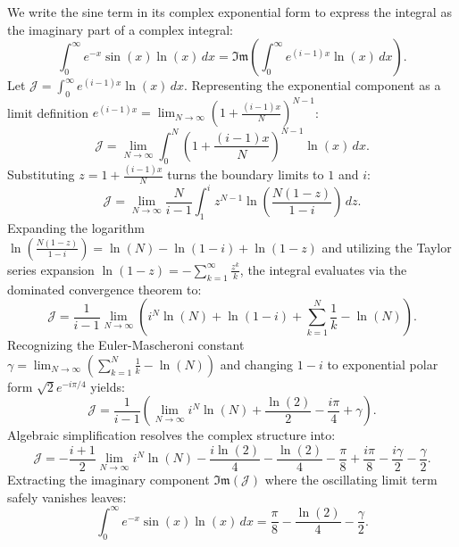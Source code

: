 \begin{questions}
    \begin{solution}
    We write the sine term in its complex exponential form to express the integral as the imaginary part of a complex integral:
    \[ \int_{0}^{\infty} e^{-x}\sin(x)\ln(x) \, dx = \mathfrak{Im}\left(\int_{0}^{\infty} e^{(i-1)x}\ln(x) \, dx\right). \]
    Let $\mathcal{J} = \int_{0}^{\infty} e^{(i-1)x}\ln(x) \, dx$. Representing the exponential component as a limit definition $e^{(i-1)x} = \lim_{N\rightarrow\infty}(1+\frac{(i-1)x}{N})^{N-1}$:
    \[ \mathcal{J} = \lim_{N\rightarrow\infty}\int_{0}^{N} \left(1+\frac{(i-1)x}{N}\right)^{N-1}\ln(x) \, dx. \]
    Substituting $z = 1+\frac{(i-1)x}{N}$ turns the boundary limits to $1$ and $i$:
    \[ \mathcal{J} = \lim_{N\rightarrow\infty} \frac{N}{i-1}\int_{1}^{i} z^{N-1}\ln\left(\frac{N(1-z)}{1-i}\right) \, dz. \]
    Expanding the logarithm $\ln(\frac{N(1-z)}{1-i}) = \ln(N) - \ln(1-i) + \ln(1-z)$ and utilizing the Taylor series expansion $\ln(1-z) = -\sum_{k=1}^{\infty}\frac{z^{k}}{k}$, the integral evaluates via the dominated convergence theorem to:
    \[ \mathcal{J} = \frac{1}{i-1}\lim_{N\rightarrow\infty}\left(i^{N}\ln(N) + \ln(1-i) + \sum_{k=1}^{N}\frac{1}{k} - \ln(N)\right). \]
    Recognizing the Euler-Mascheroni constant $\gamma = \lim_{N\to\infty} (\sum_{k=1}^N \frac{1}{k} - \ln(N))$ and changing $1-i$ to exponential polar form $\sqrt{2}e^{-i\pi/4}$ yields:
    \[ \mathcal{J} = \frac{1}{i-1}\left(\lim_{N\rightarrow\infty}i^{N}\ln(N) + \frac{\ln(2)}{2} - \frac{i\pi}{4} + \gamma\right). \]
    Algebraic simplification resolves the complex structure into:
    \[ \mathcal{J} = -\frac{i+1}{2}\lim_{N\rightarrow\infty}i^{N}\ln(N) - \frac{i\ln(2)}{4} - \frac{\ln(2)}{4} - \frac{\pi}{8} + \frac{i\pi}{8} - \frac{i\gamma}{2} - \frac{\gamma}{2}. \]
    Extracting the imaginary component $\mathfrak{Im}(\mathcal{J})$ where the oscillating limit term safely vanishes leaves:
    \[ \int_{0}^{\infty} e^{-x}\sin(x)\ln(x) \, dx = \frac{\pi}{8} - \frac{\ln(2)}{4} - \frac{\gamma}{2}. \]
    \end{solution}

\end{questions}
